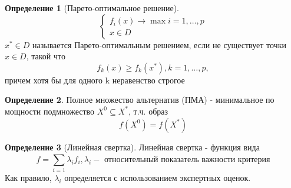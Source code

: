 \documentclass[a4paper]{article}
\theoremstyle{definition}
\newtheorem*{definition}{Определение}
\theoremstyle{remark}
\begin{document}
\begin{definition}[Парето-оптимальное решение]
	\[\begin{cases}
			f_i(x)\to \max i = 1, \dots, p \\
			x\in D
		\end{cases}\]
	$x^*\in D$ называется Парето-оптимальным решением, если
	не существует точки $x\in D$, такой что
	\[f_k(x) \ge f_k(x^*), k = 1, \dots, p,\]
	причем хотя бы для одного k неравенство строгое
\end{definition}
\begin{definition}
	Полное множество альтернатив (ПМА) - минимальное по мощности подмножество $X^0 \subseteq X^*$, т.ч. образ
	\[f(X^0) = f(X^*)\]
\end{definition}
\begin{definition}[Линейная свертка]
	Линейная свертка - функция вида
	\[f = \sum_{i=1}^{}\lambda_i f_i, \lambda_i -\text{ относительный показатель важности критерия}\]
	Как правило, $\lambda_i$ определяется с использованием экспертных оценок.
\end{definition}
\end{document}
